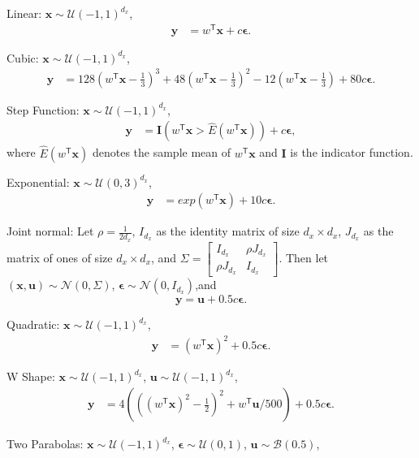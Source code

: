 \documentclass[11pt]{article}
\newcommand{\T}{^{\ensuremath{\mathsf{T}}}}           %
\providecommand{\mb}[1]{\boldsymbol{#1}}
\providecommand{\mc}[1]{\mathcal{#1}}
\begin{document}
\setcounter{equation}{0}
\begin{compactenum}
\item Linear: $\mb{x} \sim \mc{U}(-1,1)^{d_{x}}$, 
\begin{align*}
\mb{y} &=w\T \mb{x}+c\mb{\epsilon}.
\end{align*}
\item Cubic: $\mb{x} \sim \mc{U}(-1,1)^{d_{x}}$, 
\begin{align*}
\mb{y} &=128(w\T \mb{x}-\frac{1}{3})^3+48(w\T \mb{x}-\frac{1}{3})^2-12(w\T \mb{x}-\frac{1}{3})+80c\mb{\epsilon}.
\end{align*}
\item Step Function: $\mb{x} \sim \mc{U}(-1,1)^{d_{x}}$, 
\begin{align*}
\mb{y} &=\mb{I}(w\T \mb{x}>\hat{E}(w\T \mb{x}))+c\mb{\epsilon},
\end{align*}
where $\hat{E}(w\T \mb{x})$ denotes the sample mean of $w\T \mb{x}$ and $\mb{I}$ is the indicator function. 
\item Exponential: $\mb{x} \sim \mc{U}(0,3)^{d_{x}}$, 
\begin{align*}
\mb{y} &=exp(w\T \mb{x})+10c\mb{\epsilon}.
\end{align*}
\item Joint normal: Let $\rho=\frac{1}{2d_{x}}$, $I_{d_{x}}$ as the identity matrix of size $d_{x} \times d_{x}$, $J_{d_{x}}$ as the matrix of ones of size $d_{x} \times d_{x}$, and $\Sigma = \begin{bmatrix} I_{d_{x}}&\rho J_{d_{x}}\\ \rho J_{d_{x}}&I_{d_{x}} \end{bmatrix}$. Then let $(\mb{x},\mb{u}) \sim \mc{N}(0, \Sigma)$, $\mb{\epsilon} \sim \mc{N}(0, I_{d_{x}})$,and $$\mb{y}=\mb{u}+0.5c\mb{\epsilon}.$$ 
\item Quadratic: $\mb{x} \sim \mc{U}(-1,1)^{d_{x}}$,
\begin{align*}
\mb{y}&=(w\T \mb{x})^2+0.5c\mb{\epsilon}.
\end{align*}
\item W Shape: $\mb{x} \sim \mc{U}(-1,1)^{d_{x}}$, $\mb{u} \sim \mc{U}(-1,1)^{d_{x}}$,
\begin{align*}
\mb{y}&=4( ( (w\T \mb{x})^2 - \frac{1}{2} )^2 + w\T \mb{u}/500 )+0.5c\mb{\epsilon}.
\end{align*}
\item Two Parabolas: $\mb{x} \sim \mc{U}(-1,1)^{d_{x}}$, $\mb{\epsilon} \sim \mc{U}(0,1)$, $\mb{u} \sim \mc{B}(0.5)$,
\begin{align*}

\end{align*}
\end{compactenum}
\end{document}
